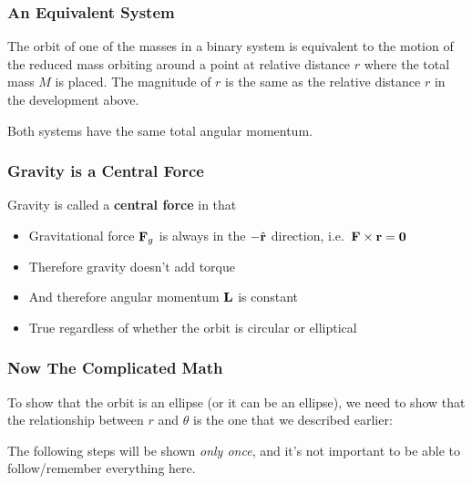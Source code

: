 \documentclass[12pt,compress,aspectratio=169]{beamer}
\newcommand{\mb}[1]{\ensuremath\mathbf{#1}}
\newcommand{\eq}[2]{\vspace{#1}{\Large\begin{displaymath}#2\end{displaymath}}}
\begin{document}
\begin{frame}
  \frametitle{An Equivalent System}
  The orbit of one of the masses in a binary system is equivalent to the motion
  of the reduced mass orbiting around a point at relative distance $r$ where
  the total mass $M$ is placed. The magnitude of $r$ is the same as the
  relative distance $r$ in the development above.
  \begin{center}
  \end{center}

  Both systems have the same total angular momentum.
\end{frame}



\begin{frame}
  \frametitle{Gravity is a Central Force}
  Gravity is called a \textbf{central force} in that
  \begin{itemize}
  \item Gravitational force $\mb{F}_g$ is always in the $-\hat{\mb{r}}$
    direction, i.e.\ $\mb{F}\times\mb{r}=\mb{0}$
  \item Therefore gravity doesn't add torque
  \item And therefore angular momentum $\mb{L}$ is constant
  \item True regardless of whether the orbit is circular or elliptical
  \end{itemize}
\end{frame}



\begin{frame}
  \frametitle{Now The Complicated Math}
  To show that the orbit is an ellipse (or it can be an ellipse), we need to
  show that the relationship between $r$ and $\theta$ is the one
  that we described earlier:

  \eq{-.15in}{
    r=\frac{a(1-e^2)}{1+e\cos\theta}
  } 
  
  The following steps will be shown \emph{only once}, and it's not important to
  be able to follow/remember everything here.
\end{frame}
\end{document}

